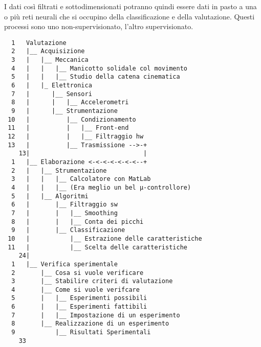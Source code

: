 	I dati cos\`i filtrati e sottodimensionati potranno quindi
	essere dati in pasto a una o pi\`u reti neurali
	che si occupino della classificazione e della valutazione.
	Questi processi sono uno non-supervisionato, l'altro supervisionato.


\begin{landscape}
\centering
{} %
\end{landscape}


\eject
\begin{framed} \begin{verbatim}
  1   Valutazione
  2   |__ Acquisizione
  3   |   |__ Meccanica
  4   |   |   |__ Manicotto solidale col movimento
  5   |   |   |__ Studio della catena cinematica
  6   |   |_ Elettronica
  7   |      |__ Sensori
  8   |      |   |__ Accelerometri
  9   |      |__ Strumentazione
 10   |          |__ Condizionamento
 11   |          |   |__ Front-end
 12   |          |   |__ Filtraggio hw
 13   |          |__ Trasmissione -->-+
    13|                               |
  1   |__ Elaborazione <-<-<-<-<-<-<--+
  2   |   |__ Strumentazione
  3   |   |   |__ Calcolatore con MatLab
  4   |   |   |__ (Era meglio un bel µ-controllore)
  5   |   |__ Algoritmi
  6   |       |__ Filtraggio sw
  7   |       |   |__ Smoothing
  8   |       |   |__ Conta dei picchi
  9   |       |__ Classificazione
 10   |           |__ Estrazione delle caratteristiche
 11   |           |__ Scelta delle caratteristiche
    24|
  1   |__ Verifica sperimentale
  2       |__ Cosa si vuole verificare
  3       |__ Stabilire criteri di valutazione
  4       |__ Come si vuole verifcare
  5       |   |__ Esperimenti possibili
  6       |   |__ Esperimenti fattibili
  7       |   |__ Impostazione di un esperimento
  8       |__ Realizzazione di un esperimento
  9           |__ Risultati Sperimentali
    33
\end{verbatim} \end{framed}